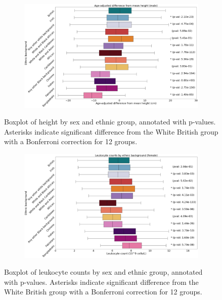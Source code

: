 \documentclass[12pt]{pnas-new}
\begin{document}
\begin{figure}
    \centering
    \begin{subfigure}{\textwidth}
    \includegraphics[width=\textwidth]{images/male_height_boxplot_annotated.pdf}
    \end{subfigure}
    \caption{Boxplot of height by sex and ethnic group, annotated with p-values. Asterisks indicate significant difference from the White British group with a Bonferroni correction for 12 groups.}
    \label{fig:supp_box_height_m}
\end{figure}

\begin{figure}
    \centering
    \begin{subfigure}{\textwidth}
    \includegraphics[width=\textwidth]{images/female_leukocyte_boxplot_annotated.pdf}
    \end{subfigure}
    \caption{Boxplot of leukocyte counts by sex and ethnic group, annotated with p-values. Asterisks indicate significant difference from the White British group with a Bonferroni correction for 12 groups.}
    \label{fig:supp_box_leukocyte_f}
\end{figure}
\end{document}
